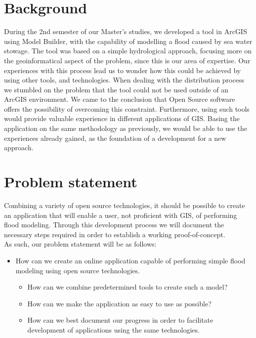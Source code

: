 
\section{Background}
During the 2nd semester of our Master's studies, we developed a tool in ArcGIS using Model Builder, with the capability of modelling a flood caused by sea water stowage. The tool was based on a simple hydrological approach, focusing more on the geoinformatical aspect of the problem, since this is our area of expertise. Our experiences with this process lead us to wonder how this could be achieved by using other tools, and technologies.   
When dealing with the distribution process we stumbled on the problem that the tool could not be used outside of an ArcGIS environment. We came to the conclusion that Open Source software offers the possibility of overcoming this constraint. Furthermore, using such tools would provide valuable experience in different applications of GIS.
Basing the application on the same methodology as previously, we would be able to use the experiences already gained, as the foundation of a development for a new approach.

\section{Problem statement}
Combining a variety of open source technologies, it should be possible to create an application that will enable a user, not proficient with GIS, of performing flood modeling. Through this development process we will document the necessary steps required in order to establish a working proof-of-concept. \\

As such, our problem statement will be as follows: 

\begin{itemize}
\item How can we create an online application capable of performing simple flood modeling using open source technologies.
\begin{itemize}
\item How can we combine predetermined tools to create such a model?
\item How can we make the application as easy to use as possible?
\item How can we best document our progress in order to facilitate development of applications using the same technologies.
\end{itemize}
\end{itemize}

